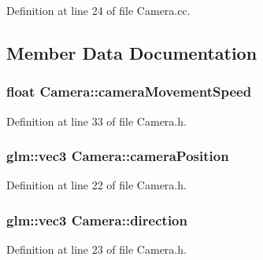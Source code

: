 Definition at line 24 of file Camera.\+cc.



\subsection{Member Data Documentation}
\hypertarget{class_camera_a0ca21737f5a9fb6a9fda61e7e92c9a5e}{}
\subsubsection[{camera\+Movement\+Speed}]{\setlength{\rightskip}{0pt plus 5cm}float Camera\+::camera\+Movement\+Speed\hspace{0.3cm}{\ttfamily [private]}}\label{class_camera_a0ca21737f5a9fb6a9fda61e7e92c9a5e}


Definition at line 33 of file Camera.\+h.

\hypertarget{class_camera_aca1334c1a10c3a1fe84a2979b205ff9a}{}
\subsubsection[{camera\+Position}]{\setlength{\rightskip}{0pt plus 5cm}glm\+::vec3 Camera\+::camera\+Position\hspace{0.3cm}{\ttfamily [private]}}\label{class_camera_aca1334c1a10c3a1fe84a2979b205ff9a}


Definition at line 22 of file Camera.\+h.

\hypertarget{class_camera_aa91491698db51f70c62199d8c2213514}{}
\subsubsection[{direction}]{\setlength{\rightskip}{0pt plus 5cm}glm\+::vec3 Camera\+::direction\hspace{0.3cm}{\ttfamily [private]}}\label{class_camera_aa91491698db51f70c62199d8c2213514}


Definition at line 23 of file Camera.\+h.

\hypertarget{class_camera_aad9d573147be409e929251eca0bea339}{}
